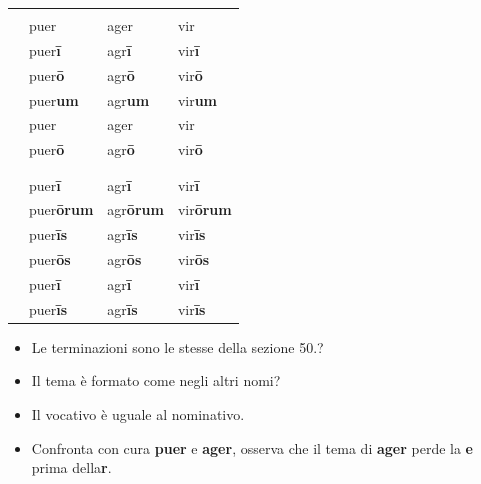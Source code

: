 \documentclass[nols]{tufte-handout}
\newcommand{\nom}{\textsc{nom}\xspace}
\newcommand{\gen}{\textsc{gen}\xspace}
\newcommand{\dat}{\textsc{dat}\xspace}
\newcommand{\acc}{\textsc{acc}\xspace}
\newcommand{\voc}{\textsc{voc}\xspace}
\newcommand{\abl}{\textsc{abl}\xspace}
\newcommand{\textls}[2][5]{%
    \begingroup\addfontfeatures{LetterSpace=#1}#2\endgroup
  }
\renewcommand{\smallcapsspacing}[1]{\textls[10]{#1}}
\renewcommand{\textsc}[1]{\smallcapsspacing{\textsmallcaps{#1}}}
\begin{document}
\begin{fullwidth}
\begin{table}[!htbp]
  \centering
  \begin{tabular}{l l l l}
	& \multicolumn{3}{c}{\textsc{Singolare}} \\

    \nom & puer            & ager           & vir  \\
    \gen & puer\textbf{ī}  & agr\textbf{ī}  & vir\textbf{ī}  \\
    \dat & puer\textbf{ō}  & agr\textbf{ō}  & vir\textbf{ō}  \\
    \acc & puer\textbf{um} & agr\textbf{um} & vir\textbf{um} \\
    \voc & puer            & ager           & vir             \\
    \abl & puer\textbf{ō}  & agr\textbf{ō}  & vir\textbf{ō}  \\
	
	\multicolumn{4}{c}{\textemdash} \\
	
	& \multicolumn{3}{c}{\textsc{Plurale}} \\
	
	\nom & puer\textbf{ī}  & agr\textbf{ī}  & vir\textbf{ī}  \\
    \gen & puer\textbf{ōrum}  & agr\textbf{ōrum}  & vir\textbf{ōrum}  \\
    \dat & puer\textbf{īs}  & agr\textbf{īs}  & vir\textbf{īs}  \\
    \acc & puer\textbf{ōs} & agr\textbf{ōs} & vir\textbf{ōs} \\
    \voc & puer\textbf{ī}  & agr\textbf{ī}  & vir\textbf{ī}   \\
    \abl & puer\textbf{īs}  & agr\textbf{īs}  & vir\textbf{īs}  \\
	
  \end{tabular}
  \label{tab:normaltab}
\end{table}
\end{fullwidth}

\begin{itemize}
\item[\textsc{1.}] Le terminazioni sono le stesse della sezione 50.?  
\item[\textsc{2.}] Il tema è formato come negli altri nomi? 
\item[\textsc{3.}] Il vocativo è uguale al nominativo.  
\item[\textsc{4.}] Confronta con cura \textbf{puer} e \textbf{ager}, osserva che il tema di \textbf{ager} perde la \textbf{e} prima della\textbf{r}.  
\end{itemize}
\end{document}
